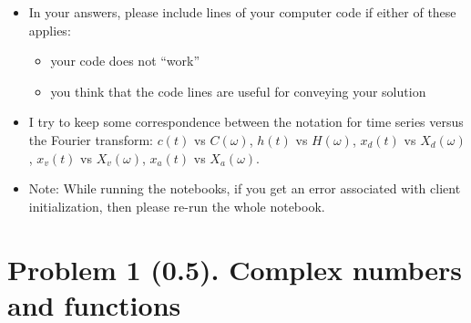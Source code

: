 \documentclass[11pt,titlepage,fleqn]{article}
\newcommand{\fft}{h}
\newcommand{\ffw}{H}
\begin{document}
\begin{itemize}
\item In your answers, please include lines of your computer code if either of these applies:
%
\begin{itemize}
\item your code does not ``work''
\item you think that the code lines are useful for conveying your solution
\end{itemize}

\item I try to keep some correspondence between the notation for time series versus the Fourier transform: $c(t)$ vs $C(\omega)$, $\fft(t)$ vs $\ffw(\omega)$, $x_d(t)$ vs $X_d(\omega)$, $x_v(t)$ vs $X_v(\omega)$, $x_a(t)$ vs $X_a(\omega)$.

\item Note: While running the notebooks, if you get an error associated with client initialization, then please re-run the whole notebook.

\end{itemize}


\pagebreak
\section*{Problem 1 (0.5). Complex numbers and functions}
\end{document}
